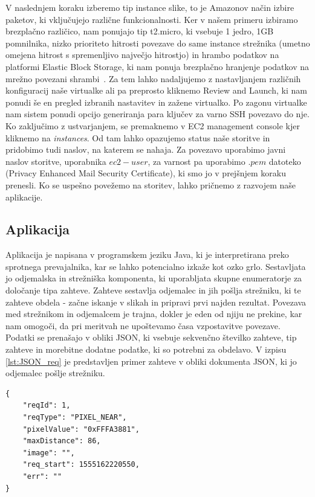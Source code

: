 V naslednjem koraku izberemo tip instance slike, to je Amazonov način izbire paketov, ki vključujejo različne funkcionalnosti. Ker v našem primeru izbiramo brezplačno različico, nam ponujajo tip t2.micro, ki vsebuje 1 jedro, 1GB pomnilnika, nizko prioriteto hitrosti povezave do same instance strežnika (umetno omejena hitrost s spremenljivo največjo hitrostjo) in hrambo podatkov na platformi Elastic Block Storage, ki nam ponuja brezplačno hranjenje podatkov na mrežno povezani shrambi~\cite{1_aws_amazon_ebs}. Za tem lahko nadaljujemo z nastavljanjem različnih konfiguracij naše virtualke ali pa preprosto kliknemo Review and Launch, ki nam ponudi še en pregled izbranih nastavitev in zažene virtualko. Po zagonu virtualke nam sistem ponudi opcijo generiranja para ključev za varno SSH povezavo do nje. Ko zaključimo z ustvarjanjem, se premaknemo v EC2 management console kjer kliknemo na \emph{instances}. Od tam lahko opazujemo status naše storitve in pridobimo tudi naslov, na katerem se nahaja. Za povezavo uporabimo javni naslov storitve, uporabnika $ec2-user$, za varnost pa uporabimo $.pem$ datoteko (Privacy Enhanced Mail Security Certificate), ki smo jo v prejšnjem koraku prenesli. Ko se uspešno povežemo na storitev, lahko pričnemo z razvojem naše aplikacije.

\subsection{Aplikacija}

Aplikacija je napisana v programskem jeziku Java, ki je interpretirana preko sprotnega prevajalnika, kar se lahko potencialno izkaže kot ozko grlo. Sestavljata jo odjemalska in strežniška komponenta, ki uporabljata skupne enumeratorje za določanje tipa zahteve. Zahteve sestavlja odjemalec in jih pošlja strežniku, ki te zahteve obdela - začne iskanje v slikah in pripravi prvi najden rezultat. Povezava med strežnikom in odjemalcem je trajna, dokler je eden od njiju ne prekine, kar nam omogoči, da pri meritvah ne upoštevamo časa vzpostavitve povezave. Podatki se prenašajo v obliki JSON, ki vsebuje sekvenčno številko zahteve, tip zahteve in morebitne dodatne podatke, ki so potrebni za obdelavo. V izpisu \ref{lst:JSON_req} je predstavljen primer zahteve v obliki dokumenta JSON, ki jo odjemalec pošlje strežniku.

\begin{lstlisting}[caption={Primer JSON zahteve.},label={lst:JSON_req},captionpos=b]
{
	"reqId": 1,
	"reqType": "PIXEL_NEAR",
	"pixelValue": "0xFFFA3881",
	"maxDistance": 86,
	"image": "",
	"req_start": 1555162220550,
	"err": ""
}
\end{lstlisting}


